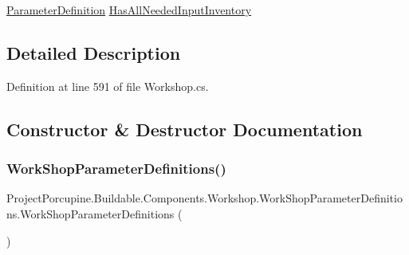 \begin{DoxyCompactItemize}
\item 
\hyperlink{class_project_porcupine_1_1_buildable_1_1_components_1_1_buildable_component_1_1_parameter_definition}{Parameter\+Definition} \hyperlink{class_project_porcupine_1_1_buildable_1_1_components_1_1_workshop_1_1_work_shop_parameter_definitions_a74182c151b69c9b59365e161292a1f36}{Has\+All\+Needed\+Input\+Inventory}
\end{DoxyCompactItemize}


\subsection{Detailed Description}


Definition at line 591 of file Workshop.\+cs.



\subsection{Constructor \& Destructor Documentation}
\mbox{\label{class_project_porcupine_1_1_buildable_1_1_components_1_1_workshop_1_1_work_shop_parameter_definitions_a277735bda1489f5268f0ae58956ece1a}} 
\subsubsection{\texorpdfstring{Work\+Shop\+Parameter\+Definitions()}{WorkShopParameterDefinitions()}}
{\footnotesize\ttfamily Project\+Porcupine.\+Buildable.\+Components.\+Workshop.\+Work\+Shop\+Parameter\+Definitions.\+Work\+Shop\+Parameter\+Definitions (\begin{DoxyParamCaption}{ }\end{DoxyParamCaption})}



